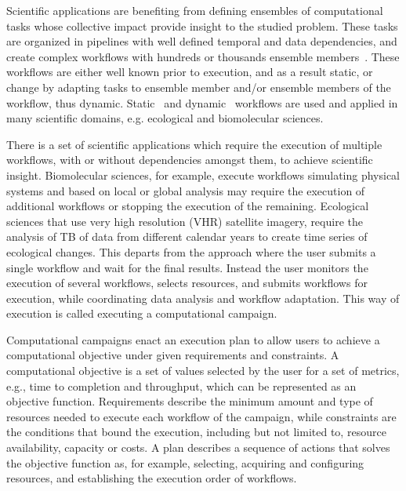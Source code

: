 Scientific applications are benefiting from defining ensembles of computational tasks whose collective impact provide insight to the studied problem.
These tasks are organized in pipelines with well defined temporal and data dependencies, and create complex workflows with hundreds or thousands ensemble members~\cite{malawski2015algorithms,rietmann2012forward,dakka2018high}.
These workflows are either well known prior to execution, and as a result static, or change by adapting tasks to ensemble member and/or ensemble members of the workflow, thus dynamic.
Static~\cite{paraskevakos2019workflow} and dynamic~\cite{dakka2018high} workflows are used and applied in many scientific domains, e.g. ecological and biomolecular sciences. 

There is a set of scientific applications which require the execution of multiple workflows, with or without dependencies amongst them, to achieve scientific insight.
Biomolecular sciences, for example, execute workflows simulating physical systems and based on local or global analysis may require the execution of additional workflows or stopping the execution of the remaining.
Ecological sciences that use very high resolution (VHR) satellite imagery, require the analysis of TB of data from different calendar years to create time series of ecological changes.
This departs from the approach where the user submits a single workflow and wait for the final results.
Instead the user monitors the execution of several workflows, selects resources, and submits workflows for execution, while coordinating data analysis and workflow adaptation.
This way of execution is called executing a computational campaign.

Computational campaigns enact an execution plan to allow users to achieve a computational objective under given requirements and constraints.
A computational objective is a set of values selected by the user for a set of metrics, e.g., time to completion and throughput, which can be represented as an objective function.
Requirements describe the minimum amount and type of resources needed to execute each workflow of the campaign, while constraints are the conditions that bound the execution, including but not limited to, resource availability, capacity or costs.
A plan describes a sequence of actions that solves the objective function as, for example, selecting, acquiring and configuring resources, and establishing the execution order of workflows.

